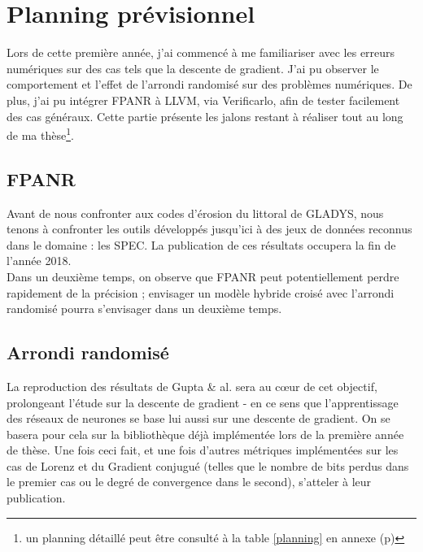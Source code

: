 \documentclass[a4paper,11pt]{article}
\begin{document}
\section{Planning prévisionnel}
Lors de cette première année, j'ai commencé à me familiariser avec les erreurs numériques sur des cas tels que la descente de gradient.
J'ai pu observer le comportement et l’effet de l’arrondi randomisé sur des problèmes numériques. 
De plus, j'ai pu intégrer FPANR à LLVM, via Verificarlo, afin de tester facilement des cas généraux.
Cette partie présente les jalons restant à réaliser tout au long de ma thèse\footnote{un planning détaillé peut être consulté à la table \ref{planning} en annexe (p\pageref{planning})}.

\subsection{FPANR}
Avant de nous confronter aux codes d'érosion du littoral de GLADYS, nous tenons à confronter les outils développés jusqu'ici à des jeux de données reconnus dans le domaine : les SPEC. La publication de ces résultats occupera la fin de l'année 2018. \\
Dans un deuxième temps, on observe que FPANR peut potentiellement perdre rapidement de la précision ; envisager un modèle hybride croisé avec l'arrondi randomisé pourra s'envisager dans un deuxième temps.

\subsection{Arrondi randomisé}
La reproduction des résultats de Gupta \& al.\cite{gupta2015deep} sera au cœur de cet objectif, prolongeant l'étude sur la descente de gradient - en ce sens que l'apprentissage des réseaux de neurones se base lui aussi sur une descente de gradient. On se basera pour cela sur la bibliothèque déjà implémentée lors de la première année de thèse. Une fois ceci fait, et une fois d'autres métriques implémentées sur les cas de Lorenz et du Gradient conjugué (telles que le nombre de bits perdus dans le premier cas ou le degré de convergence dans le second), s'atteler à leur publication.
\end{document}
